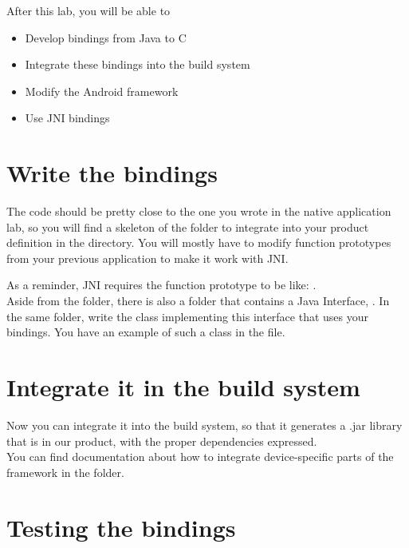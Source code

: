 
After this lab, you will be able to
\begin{itemize}
  \item Develop bindings from Java to C
  \item Integrate these bindings into the build system
  \item Modify the Android framework
  \item Use JNI bindings
\end{itemize}

\section{Write the bindings}

The code should be pretty close to the one you wrote in the native
application lab, so you will find a skeleton of the folder to
integrate into your product definition in the
 directory. You will
mostly have to modify function prototypes from your previous
application to make it work with JNI.

As a reminder, JNI requires the function prototype to be like:
.\\

Aside from the  folder, there is also a  folder that
contains a Java Interface, . In the same folder,
write the  class implementing this interface that uses your
bindings. You have an example of such a class in the 
file.

\section{Integrate it in the build system}

Now you can integrate it into the build system, so that it generates a .jar
library that is in our product, with the proper dependencies expressed.\\

You can find documentation about how to integrate device-specific parts of the
framework in the  folder.

\section{Testing the bindings}

